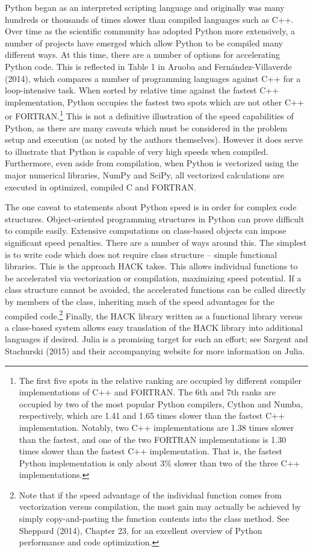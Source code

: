 \documentclass[]{article}
\begin{document}
Python began as an interpreted scripting language and originally was
many hundreds or thousands of times slower than compiled languages such
as C++. Over time as the scientific community has adopted Python more
extensively, a number of projects have emerged which allow Python to be
compiled many different ways. At this time, there are a number of
options for accelerating Python code. This is reflected in Table 1 in
Aruoba and Fernández-Villaverde (2014), which compares a number of
programming languages against C++ for a loop-intensive task. When sorted
by relative time against the fastest C++ implementation, Python occupies
the fastest two spots which are not other C++ or FORTRAN.\footnote{The
  first five spots in the relative ranking are occupied by different
  compiler implementations of C++ and FORTRAN. The 6th and 7th ranks are
  occupied by two of the most popular Python compilers, Cython and
  Numba, respectively, which are 1.41 and 1.65 times slower than the
  fastest C++ implementation. Notably, two C++ implementations are 1.38
  times slower than the fastest, and one of the two FORTRAN
  implementations is 1.30 times slower than the fastest C++
  implementation. That is, the fastest Python implementation is only
  about 3\% slower than two of the three C++ implementations.} This is
not a definitive illustration of the speed capabilities of Python, as
there are many caveats which must be considered in the problem setup and
execution (as noted by the authors themselves). However it does serve to
illustrate that Python is capable of very high speeds when compiled.
Furthermore, even aside from compilation, when Python is vectorized
using the major numerical libraries, NumPy and SciPy, all vectorized
calculations are executed in optimized, compiled C and FORTRAN.

The one caveat to statements about Python speed is in order for complex
code structures. Object-oriented programming structures in Python can
prove difficult to compile easily. Extensive computations on class-based
objects can impose significant speed penalties. There are a number of
ways around this. The simplest is to write code which does not require
class structure -- simple functional libraries. This is the approach
HACK takes. This allows individual functions to be accelerated via
vectorization or compilation, maximizing speed potential. If a class
structure cannot be avoided, the accelerated functions can be called
directly by members of the class, inheriting much of the speed
advantages for the compiled code.\footnote{Note that if the speed
  advantage of the individual function comes from vectorization versus
  compilation, the most gain may actually be achieved by simply
  copy-and-pasting the function contents into the class method. See
  Sheppard (2014), Chapter 23, for an excellent overview of Python
  performance and code optimization.} Finally, the HACK library written
as a functional library versus a class-based system allows easy
translation of the HACK library into additional languages if desired.
Julia is a promising target for such an effort; see Sargent and
Stachurski (2015) and their accompanying website for more information on
Julia.
\end{document}
